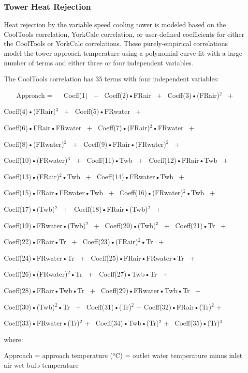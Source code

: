 \subsubsection{Tower Heat Rejection}\label{tower-heat-rejection}

Heat rejection by the variable speed cooling tower is modeled based on the CoolTools correlation, YorkCalc correlation, or user-defined coefficients for either the CoolTools or YorkCalc correlations. These purely-empirical correlations model the tower approach temperature using a polynomial curve fit with a large number of terms and either three or four independent variables.

The CoolTools correlation has 35 terms with four independent variables:

~~~ Approach = ~~ Coeff(1)~ +~ Coeff(2)•FRair~ +~ Coeff(3)•(FRair)\(^{2}\)~ +

Coeff(4)•(FRair)\(^{3}\)~ +~ Coeff(5)•FRwater~ +

Coeff(6)•FRair•FRwater~ +~ Coeff(7)•(FRair)\(^{2}\)•FRwater~ +

Coeff(8)•(FRwater)\(^{2}\)~ +~ Coeff(9)•FRair•(FRwater)\(^{2}\)~ +

Coeff(10)•(FRwater)\(^{3}\)~ +~ Coeff(11)•Twb~ +~ Coeff(12)•FRair•Twb~ +

Coeff(13)•(FRair)\(^{2}\)•Twb~ +~ Coeff(14)•FRwater•Twb~ +

Coeff(15)•FRair•FRwater•Twb~ +~ Coeff(16)•(FRwater)\(^{2}\)•Twb~ +

Coeff(17)•(Twb)\(^{2}\)~ +~ Coeff(18)•FRair•(Twb)\(^{2}\)~ +

Coeff(19)•FRwater•(Twb)\(^{2}\)~ +~ Coeff(20)•(Twb)\(^{3}\)~ +~ Coeff(21)•Tr~ +

Coeff(22)•FRair•Tr~ +~ Coeff(23)•(FRair)\(^{2}\)•Tr~ +

Coeff(24)•FRwater•Tr~ +~ Coeff(25)•FRair•FRwater•Tr~ +

Coeff(26)•(FRwater)\(^{2}\)•Tr~ +~ Coeff(27)•Twb•Tr~ +

Coeff(28)•FRair•Twb•Tr~ +~ Coeff(29)•FRwater•Twb•Tr~ +

Coeff(30)•(Twb)\(^{2}\)•Tr~ +~ Coeff(31)•(Tr)\(^{2}\) + Coeff(32)•FRair•(Tr)\(^{2}\) +

Coeff(33)•FRwater•(Tr)\(^{2}\) +~ Coeff(34)•Twb•(Tr)\(^{2}\) +~ Coeff(35)•(Tr)\(^{3}\)

where:

Approach = approach temperature (\(^{o}\)C) = outlet water temperature minus inlet air wet-bulb temperature

